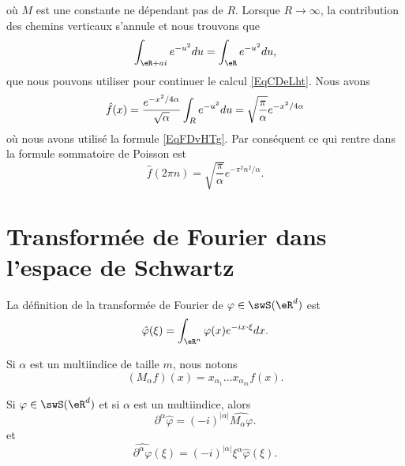 \begin{example}
\begin{equation}
    \end{equation}
    où \( M\) est une constante ne dépendant pas de \( R\). Lorsque \( R\to \infty\), la contribution des chemins verticaux s'annule et nous trouvons que
    \begin{equation}    \label{EqjrNxLr}
        \int_{\eR+ai} e^{-u^2}du=\int_{\eR} e^{-u^2}du,
    \end{equation}
    que nous pouvons utiliser pour continuer le calcul \eqref{EqCDeLht}. Nous avons
    \begin{equation}
        \hat f(x)= \frac{ e^{-x^2/4\alpha}}{\sqrt{\alpha}}\int_{R} e^{-u^2}du\\
            =\sqrt{\frac{ \pi }{ \alpha }} e^{-x^2/4\alpha}
    \end{equation}
    où nous avons utilisé la formule \eqref{EqFDvHTg}. Par conséquent ce qui rentre dans la formule sommatoire de Poisson est
    \begin{equation}
        \hat f(2\pi n)=\sqrt{\frac{ \pi }{ \alpha }} e^{-\pi^2 n^2/\alpha}.
    \end{equation}
\end{example}

\section{Transformée de Fourier dans l'espace de Schwartz}

La définition de la transformée de Fourier de \( \varphi\in\swS(\eR^d)\) est
\begin{equation}
    \hat  \varphi(\xi)=\int_{\eR^n}\varphi(x) e^{-ix\cdot \xi}dx.
\end{equation}

Si \( \alpha\) est un multiindice de taille \( m\), nous notons
\begin{equation}
    (M_{\alpha}f)(x)=x_{\alpha_1}\ldots x_{\alpha_m}f(x).
\end{equation}

\begin{lemma}   \label{LemQPVQjCx}
    Si \( \varphi\in\swS(\eR^d)\) et si \( \alpha\) est un multiindice, alors
    \begin{equation}
        \partial^{\alpha}\hat\varphi=(-i)^{| \alpha |}\widehat{M_{\alpha}\varphi}.
    \end{equation}
    et
    \begin{equation}
        \widehat{\partial^{\alpha}\varphi}(\xi)=(-i)^{| \alpha |}\xi^{\alpha}\hat\varphi(\xi).
    \end{equation}
\end{lemma}

